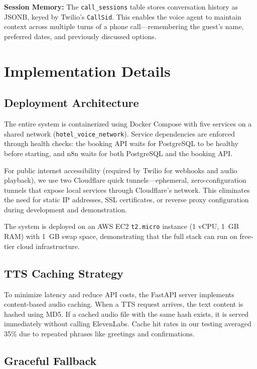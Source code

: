 \documentclass[conference]{IEEEtran}
\begin{document}
\textbf{Session Memory:} The \texttt{call\_sessions} table stores conversation history as JSONB, keyed by Twilio's \texttt{CallSid}. This enables the voice agent to maintain context across multiple turns of a phone call---remembering the guest's name, preferred dates, and previously discussed options.

\section{Implementation Details}

\subsection{Deployment Architecture}

The entire system is containerized using Docker Compose with five services on a shared network (\texttt{hotel\_voice\_network}). Service dependencies are enforced through health checks: the booking API waits for PostgreSQL to be healthy before starting, and n8n waits for both PostgreSQL and the booking API.

For public internet accessibility (required by Twilio for webhooks and audio playback), we use two Cloudflare quick tunnels---ephemeral, zero-configuration tunnels that expose local services through Cloudflare's network. This eliminates the need for static IP addresses, SSL certificates, or reverse proxy configuration during development and demonstration.

The system is deployed on an AWS EC2 \texttt{t2.micro} instance (1 vCPU, 1~GB RAM) with 1~GB swap space, demonstrating that the full stack can run on free-tier cloud infrastructure.

\subsection{TTS Caching Strategy}

To minimize latency and reduce API costs, the FastAPI server implements content-based audio caching. When a TTS request arrives, the text content is hashed using MD5. If a cached audio file with the same hash exists, it is served immediately without calling ElevenLabs. Cache hit rates in our testing averaged 35\% due to repeated phrases like greetings and confirmations.

\subsection{Graceful Fallback}
\end{document}
